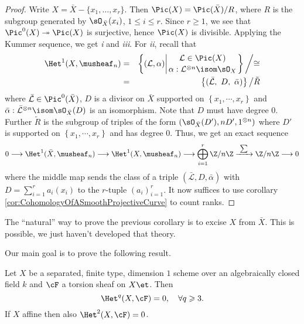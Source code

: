\begin{proof}
Write $X = \bar X - \{ x_1, \dots, x_r\}$. Then $\Pic(X) = \Pic(\bar X)/ R$, where $R$ is the subgroup generated by $\sO_{\bar X}(x_i)$, $1 \leqslant i \leqslant r$. Since $r \geqslant 1$, we see that $\Pic^0(X) \twoheadrightarrow \Pic(X)$ is surjective, hence $\Pic(X)$ is divisible. Applying the Kummer sequence, we get {\it i} and {\it iii}. For {\it ii}, recall that
\begin{eqnarray*}
\Het^1(X, \musheaf_n) & = &
\left\{
{(\mathcal L, \alpha) {\bigg |} {{\mathcal L \in \Pic(X) }
\atop 
{\alpha: \mathcal L^{\otimes n} \isom \sO_X}}}
\right\}
{\bigg /} {\cong} \\
& = & 
\left\{(\bar{\mathcal L}, \ D, \ \bar \alpha) \right\} {\big /} \tilde{R}
\end{eqnarray*}
where $\bar{\mathcal L} \in \Pic^0(\bar X)$, $D$ is a divisor on $\bar X$ supported on $\left\{x_1, \cdots, x_r\right\}$ and $ \bar{\alpha}: \bar{\mathcal L}^{\otimes n} \isom \sO_{\bar{X}}(D)$ is an isomorphism. Note that $D$ must have degree 0. Further $\tilde{R}$ is the subgroup of triples of the form $(\sO_{\bar X}(D'), n D', 1^{\otimes n})$ where $D'$ is supported on $\left\{x_1, \cdots, x_r\right\}$ and has degree 0. Thus, we get an exact sequence
$$
0 \longrightarrow
\Het^1(\bar X, \musheaf_n) \longrightarrow
\Het^1(X, \musheaf_n)  \longrightarrow
\bigoplus_{i=1}^r \Z/n\Z 
\xrightarrow{\ \sum\ }
\Z/n\Z \longrightarrow 0
$$
where the middle map sends the class of a triple $(\bar{ \mathcal L}, D, \bar \alpha)$ with $D = \sum_{i=1}^r a_i (x_i)$ to the $r$-tuple $(a_i)_{i=1}^r$. It now suffices to use corollary \ref{cor:CohomologyOfASmoothProjectiveCurve} to count ranks.
\end{proof}

\begin{remark}
The ``natural'' way to prove the previous corollary is to excise $X$ from $\bar X$. This is possible, we just haven't developed that theory.
\end{remark}

Our main goal is to prove the following result.

\begin{thm} \label{thm:vanishingForCurves}
Let $X$ be a separated, finite type, dimension $1$ scheme over an algebraically closed field $k$ and  $\cF$ a torsion sheaf on $X\et$. Then 
$$
\Het^q(X, \cF) = 0, \quad \forall q\geqslant 3.
$$ 
If $X$ affine then also $\Het^2(X, \cF) = 0$. 
\end{thm}	

